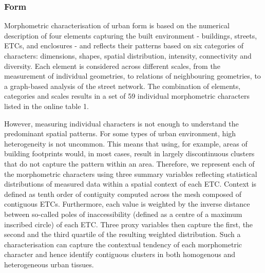 \subsubsection*{Form}
Morphometric characterisation of urban form is based on the numerical description
of four elements capturing the built environment - buildings, streets, ETCs, and
enclosures - and reflects their patterns based on six categories of
characters: dimensions, shapes, spatial
distribution, intensity, connectivity and diversity\cite{fleischmann2020a}. Each element is considered across
different scales, from the measurement of individual geometries, to relations of
neighbouring geometries, to a graph-based analysis of the street network. The combination of
elements, categories and scales results in a set of 59 individual morphometric
characters listed in the online table 1.


However, measuring individual characters is not enough to understand the predominant
spatial patterns. For some types of urban environment, high heterogeneity is not
uncommon. This means that using, for example, areas of building footprints would, in most cases, result
in largely discontinuous clusters that do not capture the pattern within an area. Therefore, we represent each of the
morphometric characters using three summary variables reflecting statistical distributions
of measured data within a spatial context of each ETC. Context is defined as
tenth
order of contiguity computed across the mesh composed of contiguous ETCs. Furthermore, each
value is weighted by the inverse distance between so-called poles of inaccessibility
(defined as a centre of a maximum inscribed circle) of each ETC. Three proxy variables
then capture the first, the second and the third quartile of the resulting weighted
distribution. Such a characterisation can capture the contextual tendency of each
morphometric character and hence identify contiguous clusters in both homogenous and
heterogeneous urban tissues.

